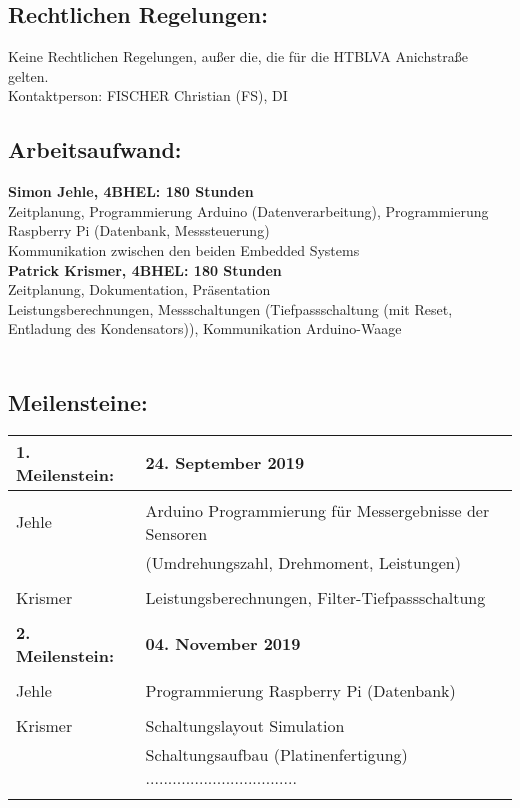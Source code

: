 \documentclass[12pt]{article}
\begin{document}
\begin{itemize}
\subsection*{Rechtlichen Regelungen:}
Keine Rechtlichen Regelungen, außer die, die für die HTBLVA Anichstraße gelten.\\
Kontaktperson:  FISCHER Christian (FS), DI\\


\newpage
\subsection*{Arbeitsaufwand:}
\textbf{Simon Jehle, 4BHEL: 180 Stunden}\\
Zeitplanung, Programmierung Arduino (Datenverarbeitung), Programmierung Raspberry Pi (Datenbank, Messsteuerung)\\
Kommunikation zwischen den beiden Embedded Systems\\

\textbf{Patrick Krismer, 4BHEL: 180 Stunden }\\
Zeitplanung, Dokumentation, Präsentation\\
Leistungsberechnungen, Messschaltungen (Tiefpassschaltung (mit Reset, Entladung des Kondensators)), Kommunikation Arduino-Waage\\\\


\subsection*{Meilensteine:} 
\begin{tabular}{| l | l |}
\hline
\textbf{1. Meilenstein: } & \textbf{24. September 2019} \\ \hline & \\
Jehle & Arduino Programmierung  für Messergebnisse der Sensoren \\
            & (Umdrehungszahl, Drehmoment, Leistungen) \\ & \\
Krismer & Leistungsberechnungen, Filter-Tiefpassschaltung \\ & \\ \hline 


\textbf{2. Meilenstein: } & \textbf{04. November  2019} \\ \hline & \\
 Jehle & Programmierung Raspberry Pi (Datenbank) \\ & \\
Krismer & Schaltungslayout Simulation \\ 
	   		  & Schaltungsaufbau (Platinenfertigung) .................................. \\ & \\ \hline 



\end{tabular}
\end{itemize}
\end{document}
